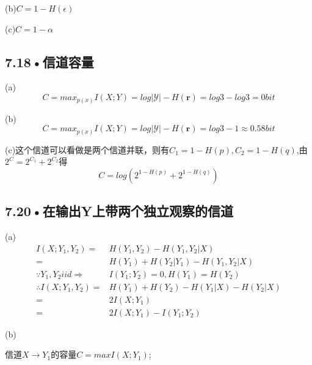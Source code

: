 \documentclass[UTF8]{ctexart}
\begin{document}
(b)$C=1-H(\epsilon)$

(c)$C=1-\alpha$

\subsection*{7.18•信道容量}
(a)$$C=max_{p(x)}I(X;Y)=log|\mathcal{Y} |-H(\textbf{r})=log3-log3=0 bit $$

(b)$$ C=max_{p(x)}I(X;Y)=log|\mathcal{Y} |-H(\textbf{r})=log3-1 \approx 0.58bit $$

(c)这个信道可以看做是两个信道并联，则有$C_1 = 1-H(p),C_2 = 1-H(q)$,由$2^C = 2^{C_1}+2^{C_2}$得
$$C = log(2^{1-H(p)}+2^{1-H(q)}) $$
\subsection*{7.20•在输出Y上带两个独立观察的信道}
(a)\begin{equation*}
    \begin{split}
        I(X;Y_1,Y_2)=&H(Y_1,Y_2)-H(Y_1,Y_2|X)\\
        =& H(Y_1)+H(Y_2|Y_1)-H(Y_1,Y_2|X)\\
        \because Y_1,Y_2 iid\Rightarrow &I(Y_1;Y_2)=0, H(Y_1)=H(Y_2)\\
        \therefore I(X;Y_1,Y_2)=&H(Y_1)+H(Y_2)-H(Y_1|X)-H(Y_2|X)\\
        =& 2I(X;Y_1)\\
        =&2I(X;Y_1)-I(Y_1;Y_2)
    \end{split}
\end{equation*}

(b)

信道$X\rightarrow Y_1$的容量$C=maxI(X;Y_1)$;
\end{document}
